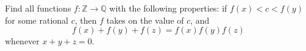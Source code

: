 Find all functions $f:\mathbb{Z}\to \mathbb{Q}$ with the following properties: if $f(x)<c<f(y)$ for some rational $c$, then $f$ takes on the value of $c$, and
\[f(x)+f(y)+f(z)=f(x)f(y)f(z)\]
whenever $x+y+z=0$.